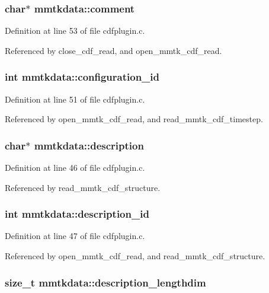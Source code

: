 \subsubsection{\setlength{\rightskip}{0pt plus 5cm}char$\ast$ mmtkdata::comment}\label{structmmtkdata_m19}




Definition at line 53 of file cdfplugin.c.

Referenced by close\_\-cdf\_\-read, and open\_\-mmtk\_\-cdf\_\-read.
\subsubsection{\setlength{\rightskip}{0pt plus 5cm}int mmtkdata::configuration\_\-id}\label{structmmtkdata_m17}




Definition at line 51 of file cdfplugin.c.

Referenced by open\_\-mmtk\_\-cdf\_\-read, and read\_\-mmtk\_\-cdf\_\-timestep.
\subsubsection{\setlength{\rightskip}{0pt plus 5cm}char$\ast$ mmtkdata::description}\label{structmmtkdata_m12}




Definition at line 46 of file cdfplugin.c.

Referenced by read\_\-mmtk\_\-cdf\_\-structure.
\subsubsection{\setlength{\rightskip}{0pt plus 5cm}int mmtkdata::description\_\-id}\label{structmmtkdata_m13}




Definition at line 47 of file cdfplugin.c.

Referenced by open\_\-mmtk\_\-cdf\_\-read, and read\_\-mmtk\_\-cdf\_\-structure.
\subsubsection{\setlength{\rightskip}{0pt plus 5cm}size\_\-t mmtkdata::description\_\-lengthdim}\label{structmmtkdata_m11}





